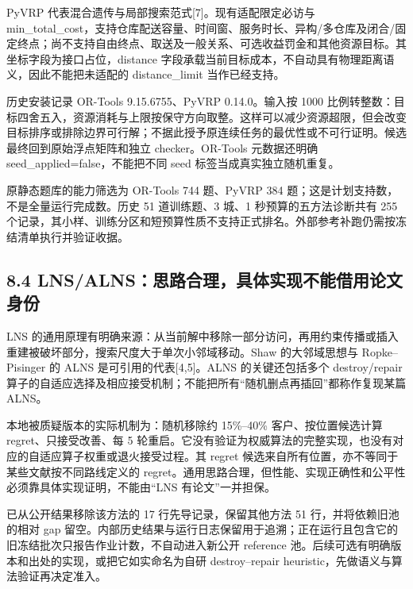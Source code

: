 \documentclass[UTF8,10pt,a4paper,fontset=fandol]{ctexart}
\begin{document}
PyVRP 代表混合遗传与局部搜索范式[7]。现有适配限定必访与 min\_\allowbreak{}total\_\allowbreak{}cost，支持仓库配送容量、时间窗、服务时长、异构/\allowbreak{}多仓库及闭合/\allowbreak{}固定终点；尚不支持自由终点、取送及一般关系、可选收益罚金和其他资源目标。其坐标字段为接口占位，distance 字段承载当前目标成本，不自动具有物理距离语义，因此不能把未适配的 distance\_\allowbreak{}limit 当作已经支持。


历史安装记录 OR-Tools 9.15.6755、PyVRP 0.14.0。输入按 1000 比例转整数：目标四舍五入，资源消耗与上限按保守方向取整。这样可以减少资源超限，但会改变目标排序或排除边界可行解；不据此授予原连续任务的最优性或不可行证明。候选最终回到原始浮点矩阵和独立 checker。OR-Tools 元数据还明确 seed\_\allowbreak{}applied=false，不能把不同 seed 标签当成真实独立随机重复。


原静态题库的能力筛选为 OR-Tools 744 题、PyVRP 384 题；这是计划支持数，不是全量运行完成数。历史 51 道训练题、3 城、1 秒预算的五方法诊断共有 255 个记录，其小样、训练分区和短预算性质不支持正式排名。外部参考补跑仍需按冻结清单执行并验证收据。


\subsection*{8.4 LNS/\allowbreak{}ALNS：思路合理，具体实现不能借用论文身份}


LNS 的通用原理有明确来源：从当前解中移除一部分访问，再用约束传播或插入重建被破坏部分，搜索尺度大于单次小邻域移动。Shaw 的大邻域思想与 Ropke–Pisinger 的 ALNS 是可引用的代表[4,5]。ALNS 的关键还包括多个 destroy/\allowbreak{}repair 算子的自适应选择及相应接受机制；不能把所有“随机删点再插回”都称作复现某篇 ALNS。


本地被质疑版本的实际机制为：随机移除约 15\%–40\% 客户、按位置候选计算 regret、只接受改善、每 5 轮重启。它没有验证为权威算法的完整实现，也没有对应的自适应算子权重或退火接受过程。其 regret 候选来自所有位置，亦不等同于某些文献按不同路线定义的 regret。通用思路合理，但性能、实现正确性和公平性必须靠具体实现证明，不能由“LNS 有论文”一并担保。


已从公开结果移除该方法的 17 行先导记录，保留其他方法 51 行，并将依赖旧池的相对 gap 留空。内部历史结果与运行日志保留用于追溯；正在运行且包含它的旧冻结批次只报告作业计数，不自动进入新公开 reference 池。后续可选有明确版本和出处的实现，或把它如实命名为自研 destroy–repair heuristic，先做语义与算法验证再决定准入。
\end{document}
